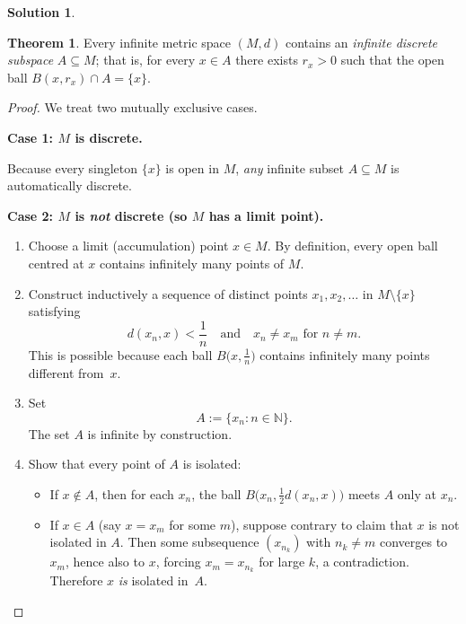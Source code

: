 \documentclass[12pt]{article}
\theoremstyle{definition} %
\newtheorem{solution}{Solution}
\newtheorem{theorem}{Theorem}
\theoremstyle{plain} %
\begin{document}
    \begin{solution}
      \begin{theorem}
        Every infinite metric space $(M,d)$ contains an \emph{infinite
        discrete subspace} $A\subseteq M$; that is, for every $x\in A$
        there exists $r_x>0$ such that the open ball $B(x,r_x)\cap A=\{x\}$.
        \end{theorem}
        
        \begin{proof}
        We treat two mutually exclusive cases.
        
        \medskip
        \textbf{Case 1: $M$ is discrete.}
        
        Because every singleton $\{x\}$ is open in $M$, \emph{any} infinite
        subset $A\subseteq M$ is automatically discrete.
        
        \medskip
        \textbf{Case 2: $M$ is \emph{not} discrete (so $M$ has a limit point).}
        
        \begin{enumerate}
          \item Choose a limit (accumulation) point $x\in M$.
                By definition, every open ball centred at $x$ contains
                infinitely many points of $M$.
        
          \item Construct inductively a sequence of distinct points
                $x_1,x_2,\dots$ in $M\setminus\{x\}$ satisfying
                \[
                  d(x_n,x)<\frac1n
                  \quad\text{and}\quad
                  x_n\neq x_m \text{ for } n\neq m.
                \]
                This is possible because each ball
                $B\!\bigl(x,\tfrac1n\bigr)$ contains infinitely many points
                different from~$x$.
        
          \item Set
                \[
                  A:=\{x_n : n\in\mathbb N\}.
                \]
                The set $A$ is infinite by construction.
          \item Show that every point of $A$ is isolated:
        
                \begin{itemize}
                  \item If $x\notin A$, then for each $x_n$,
                        the ball
                        $B\!\bigl(x_n,\tfrac12 d(x_n,x)\bigr)$
                        meets $A$ only at $x_n$.
                  \item If $x\in A$ (say $x=x_m$ for some $m$), suppose
                        contrary to claim that $x$ is not isolated in $A$.
                        Then some subsequence $(x_{n_k})$ with
                        $n_k\neq m$ converges to $x_m$, hence also to $x$,
                        forcing $x_m=x_{n_k}$ for large $k$, a contradiction.
                        Therefore $x$ \emph{is} isolated in~$A$.
                \end{itemize}
        

\end{enumerate}
\end{proof}
\end{solution}
\end{document}
